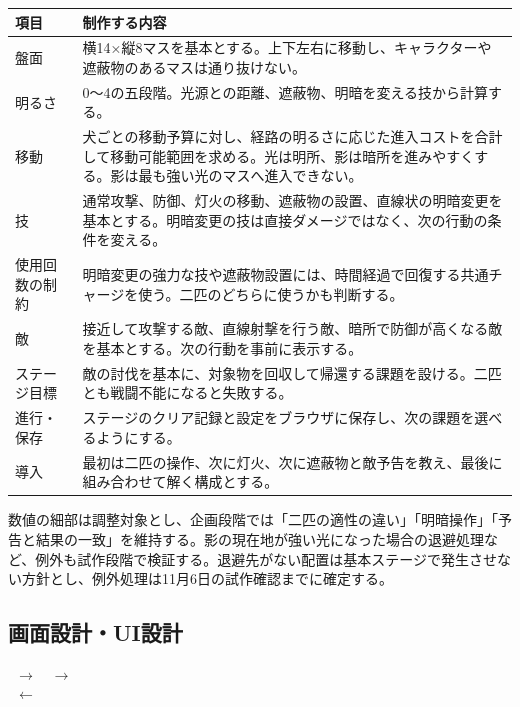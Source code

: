 \documentclass[a4paper,11pt,dvipdfmx]{jsarticle}
\begin{document}
{\small
\begin{longtable}{@{}P{0.23\dimexpr{}\tabcolsep\relax}P{0.77\dimexpr{}\tabcolsep\relax}@{}}
\toprule
\textbf{項目} & \textbf{制作する内容} \\
\midrule
\endhead
盤面 & 横14×縦8マスを基本とする。上下左右に移動し、キャラクターや遮蔽物のあるマスは通り抜けない。 \\
明るさ & 0～4の五段階。光源との距離、遮蔽物、明暗を変える技から計算する。 \\
移動 & 犬ごとの移動予算に対し、経路の明るさに応じた進入コストを合計して移動可能範囲を求める。光は明所、影は暗所を進みやすくする。影は最も強い光のマスへ進入できない。 \\
技 & 通常攻撃、防御、灯火の移動、遮蔽物の設置、直線状の明暗変更を基本とする。明暗変更の技は直接ダメージではなく、次の行動の条件を変える。 \\
使用回数の制約 & 明暗変更の強力な技や遮蔽物設置には、時間経過で回復する共通チャージを使う。二匹のどちらに使うかも判断する。 \\
敵 & 接近して攻撃する敵、直線射撃を行う敵、暗所で防御が高くなる敵を基本とする。次の行動を事前に表示する。 \\
ステージ目標 & 敵の討伐を基本に、対象物を回収して帰還する課題を設ける。二匹とも戦闘不能になると失敗する。 \\
進行・保存 & ステージのクリア記録と設定をブラウザに保存し、次の課題を選べるようにする。 \\
導入 & 最初は二匹の操作、次に灯火、次に遮蔽物と敵予告を教え、最後に組み合わせて解く構成とする。 \\
\bottomrule
\end{longtable}
}

数値の細部は調整対象とし、企画段階では「二匹の適性の違い」「明暗操作」「予告と結果の一致」を維持する。影の現在地が強い光になった場合の退避処理など、例外も試作段階で検証する。退避先がない配置は基本ステージで発生させない方針とし、例外処理は11月6日の試作確認までに確定する。

\subsection{画面設計・UI設計}

\begin{center}
\ $\rightarrow$\ \ $\rightarrow$\ \\[3mm]
\ $\longleftarrow$\ 
\end{center}
\end{document}
